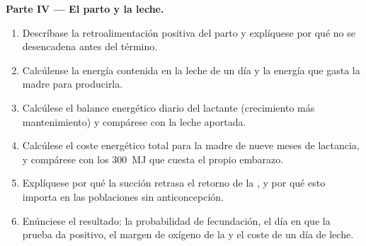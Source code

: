 \begin{problem}
\medskip
\noindent\textbf{Parte IV --- El parto y la leche.}
\begin{enumerate}[resume]
  \item Descríbase la retroalimentación positiva del parto y explíquese
        por qué no se desencadena antes del término.
  \item Calcúlense la energía contenida en la leche de un día y la energía
        que gasta la madre para producirla.
  \item Calcúlese el balance energético diario del lactante (crecimiento
        más mantenimiento) y compárese con la leche aportada.
  \item Calcúlese el coste energético total para la madre de nueve meses
        de lactancia, y compárese con los \qty{300}{MJ} que cuesta el
        propio embarazo.
  \item Explíquese por qué la succión retrasa el retorno de la
        , y por qué esto importa en las poblaciones sin
        anticoncepción.
  \item Enúnciese el resultado: la probabilidad de fecundación, el día en
        que la prueba da positivo, el margen de oxígeno de la  y el
        coste de un día de leche.
\end{enumerate}
\end{problem}
